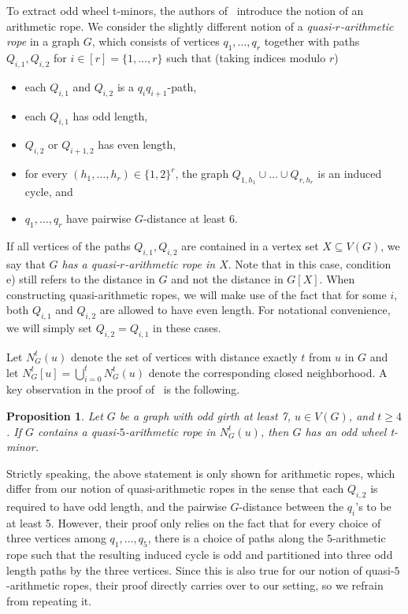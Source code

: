\documentclass{article}
\newtheorem{proposition}[theorem]{Proposition}
\begin{document}
To extract odd wheel t-minors, the authors of~\cite{chudnovsky2024colouringtperfectgraphs} introduce the notion of an arithmetic rope.
We consider the slightly different notion of a \emph{quasi-$r$-arithmetic rope} in a graph $G$, which consists of vertices $q_1,\dots,q_r$ together with paths $Q_{i,1}, Q_{i,2}$ for $i \in [r] = \{1, \dots, r\}$ such that (taking indices modulo $r$)
\begin{itemize}
    \item[a)] each $Q_{i,1}$ and $Q_{i, 2}$ is a $q_iq_{i + 1}$-path,
    \item[b)] each $Q_{i,1}$ has odd length,
    \item[c)] $Q_{i, 2}$ or $Q_{i + 1, 2}$ has even length,
    \item[d)] for every $(h_1,\dots,h_r) \in \{1,2\}^r$, the graph $Q_{1,h_1} \cup \dots \cup Q_{r,h_r}$ is an induced cycle, and
    \item[e)] $q_1, \dots, q_r$ have pairwise $G$-distance at least 6.
\end{itemize}
If all vertices of the paths $Q_{i,1}, Q_{i,2}$ are contained in a vertex set $X \subseteq V(G)$, we say that \emph{$G$ has a quasi-$r$-arithmetic rope in $X$}.
Note that in this case, condition e) still refers to the distance in $G$ and not the distance in $G[X]$.
When constructing quasi-arithmetic ropes, we will make use of the fact that for some $i$, both $Q_{i,1}$ and $Q_{i,2}$ are allowed to have even length.
For notational convenience, we will simply set $Q_{i, 2} = Q_{i, 1}$ in these cases.

Let $N_G^t(u)$ denote the set of vertices with distance exactly $t$ from $u$ in $G$ and let $N_G^t[u] = \bigcup_{i = 0}^t N_G^t(u)$ denote the corresponding closed neighborhood.
A key observation in the proof of~\cite{chudnovsky2024colouringtperfectgraphs} is the following.
\begin{proposition}\label{prop:t_minor_in_rope}
    Let $G$ be a graph with odd girth at least 7, $u \in V(G)$, and $t \ge 4$. If $G$ contains a quasi-$5$-arithmetic rope in $N_G^t(u)$, then $G$ has an odd wheel t-minor.
\end{proposition}
Strictly speaking, the above statement is only shown for arithmetic ropes, which differ from our notion of quasi-arithmetic ropes in the sense that each $Q_{i,2}$ is required to have odd length, and the pairwise $G$-distance between the $q_i$'s to be at least 5. However, their proof only relies on the fact that for every choice of three vertices among $q_1,\dots,q_5$, there is a choice of paths along the $5$-arithmetic rope such that the resulting induced cycle is odd and partitioned into three odd length paths by the three vertices. Since this is also true for our notion of quasi-$5$-arithmetic ropes, their proof directly carries over to our setting, so we refrain from repeating it.
\end{document}
